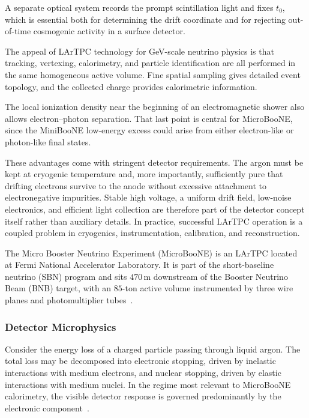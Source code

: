 

A separate optical system records the prompt scintillation light and fixes
\(t_0\), which is essential both for determining the drift coordinate and for
rejecting out-of-time cosmogenic activity in a surface detector.

The appeal of LArTPC technology for GeV-scale neutrino physics is that
tracking, vertexing, calorimetry, and particle identification are all
performed in the same homogeneous active volume. Fine spatial sampling gives
detailed event topology, and the collected charge provides calorimetric
information.

The local ionization density near the beginning of an electromagnetic shower
also allows electron--photon separation. That last point is central for
MicroBooNE, since the MiniBooNE low-energy excess could arise from either
electron-like or photon-like final states.

These advantages come with stringent detector requirements. The argon must be kept at cryogenic temperature and, more importantly, sufficiently pure that drifting electrons survive to the anode without excessive attachment to electronegative impurities. Stable high voltage, a uniform drift field, low-noise electronics, and efficient light collection are therefore part of the detector concept itself rather than auxiliary details. In practice, successful LArTPC operation is a coupled problem in cryogenics, instrumentation, calibration, and reconstruction.

The Micro Booster Neutrino Experiment (MicroBooNE) is an LArTPC located at Fermi National Accelerator Laboratory. It is part of the short-baseline neutrino (SBN) program and sits \(470\,\mathrm{m}\) downstream of the Booster Neutrino Beam (BNB) target, with an \(85\)-ton active volume instrumented by three wire planes and photomultiplier tubes~\cite{MicroBooNEDesign}.

\subsubsection{Detector Microphysics}

Consider the energy loss of a charged particle passing through liquid argon.
The total loss may be decomposed into electronic stopping, driven by inelastic
interactions with medium electrons, and nuclear stopping, driven by elastic
interactions with medium nuclei. In the regime most relevant to MicroBooNE
calorimetry, the visible detector response is governed predominantly by the
electronic component~\cite{ThomasImel1987,Doke2002}.

